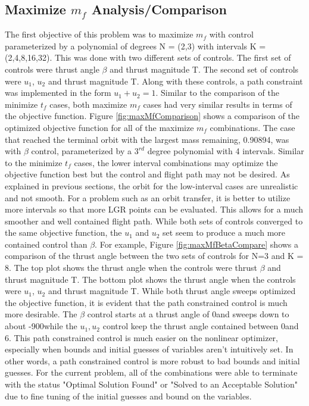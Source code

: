 \documentclass[]{article}
\begin{document}
    \subsection{Maximize \(m_f\) Analysis/Comparison}
   	The first objective of this problem was to maximize \(m_f\) with control parameterized by a polynomial of degrees N = (2,3) with intervals K = (2,4,8,16,32). This was done with two different sets of controls. The first set of controls were thrust angle \(\beta\) and thrust magnitude T. The second set of controls were \(u_1\), \(u_2\) and thrust magnitude T. Along with these controls, a path constraint was implemented in the form \(u_1 + u_2 = 1\). Similar to the comparison of the minimize \(t_f\) cases, both maximize \(m_f\) cases had very similar results in terms of the objective function. Figure \ref{fig:maxMfComparison} shows a comparison of the optimized objective function for all of the maximize \(m_f\) combinations. The case that reached the terminal orbit with the largest mass remaining, 0.90894, was with \(\beta\) control, parameterized by a \(3^{rd}\) degree polynomial with 4 intervals. Similar to the minimize \(t_f\) cases, the lower interval combinations may optimize the objective function best but the control and flight path may not be desired. As explained in previous sections, the orbit for the low-interval cases are unrealistic and not smooth. For a problem such as an orbit transfer, it is better to utilize more intervals so that more LGR points can be evaluated. This allows for a much smoother and well contained flight path. While both sets of controls converged to the same objective function, the \(u_1\) and \(u_2\) set seem to produce a much more contained control than \(\beta\). For example, Figure \ref{fig:maxMfBetaCompare} shows a comparison of the thrust angle between the two sets of controls for N=3 and K = 8. The top plot shows the thrust angle when the controls were thrust \(\beta\) and thrust magnitude T. The bottom plot shows the thrust angle when the controls were \(u_1\), \(u_2\) and thrust magnitude T. While both thrust angle sweeps optimized the objective function, it is evident that the path constrained control is much more desirable. The \(\beta\) control starts at a thrust angle of 0\degree and sweeps down to about -900\degree  while the \(u_1, u_2\) control keep the thrust angle contained between 0\degree  and 6\degree. This path constrained control is much easier on the nonlinear optimizer, especially when bounds and initial guesses of variables aren't intuitively set. In other words, a path constrained control is more robust to bad bounds and initial guesses. For the current problem, all of the combinations were able to terminate with the status "Optimal Solution Found" or "Solved to an Acceptable Solution" due to fine tuning of the initial guesses and bound on the variables.
\end{document}

